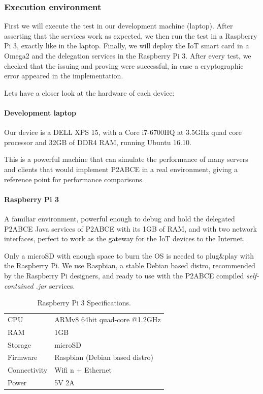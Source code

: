 \documentclass[journal]{IEEEtran}
\begin{document}
\hfil

\subsubsection{Execution environment}

First we will execute the test in our development machine (laptop). After asserting that the services work as expected, we then run the test in a Raspberry Pi 3, exactly like in the laptop. Finally, we will deploy the IoT smart card in a Omega2 and the delegation services in the Raspberry Pi 3. After every test, we checked that the issuing and proving were successful, in case a cryptographic error appeared in the implementation. 

Lets have a closer look at the hardware of each device:


\paragraph{Development laptop}
Our device is a DELL XPS 15, with a Core i7-6700HQ at 3.5GHz quad core processor and 32GB of DDR4 RAM, running Ubuntu 16.10.

This is a powerful machine that can simulate the performance of many servers and clients that would implement P2ABCE in a real environment, giving a reference point for performance comparisons.

\paragraph{Raspberry Pi 3} A familiar environment, powerful enough to debug and hold the delegated P2ABCE Java services of P2ABCE with its 1GB of RAM, and with two network interfaces, perfect to work as the gateway for the IoT devices to the Internet.

Only a microSD with enough space to burn the OS is needed to plug\&play with the Raspberry Pi. We use Raspbian, a stable Debian based distro, recommended by the Raspberry Pi designers, and ready to use with the P2ABCE compiled \textit{self-contained .jar} services.

\begin{table}[h]
	\myfloatalign
	\begin{tabular}{ll} \toprule
		CPU & ARMv8 64bit quad-core @1.2GHz \\
		RAM & 1GB \\
		Storage & microSD \\
		Firmware & Raspbian (Debian based distro) \\
		Connectivity & Wifi n + Ethernet \\
		Power & 5V 2A \\
		\bottomrule
	\end{tabular}
	\caption[Raspberry Pi 3 Specifications]{Raspberry Pi 3 Specifications.}
	\label{tab:RPi3Specs}
\end{table}
\end{document}
